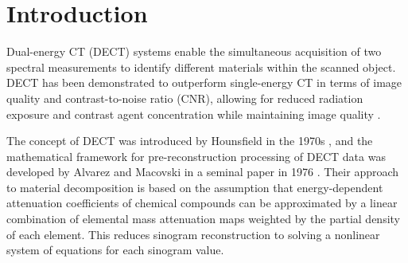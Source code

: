 \documentclass[12pt,twoside]{article}   %
\begin{document}
\newpage     %


\tableofcontents

\newpage

\setlength{\baselineskip}{0.7cm}      %

\setcounter{page}{1}
\pagestyle{fancy}

\section{Introduction}\label{sec:introduction}
Dual-energy CT (DECT) systems enable the simultaneous acquisition of two spectral measurements to identify different materials within the scanned object. DECT has been demonstrated to outperform single-energy CT in terms of image quality and contrast-to-noise ratio (CNR), allowing for reduced radiation exposure and contrast agent concentration while maintaining image quality \cite{Grant2014, Leng2015, Kalisz2018, Sakabe2018, Tabari2020}.

The concept of DECT was introduced by Hounsfield in the 1970s \cite{Hounsfield}, and the mathematical framework for pre-reconstruction processing of DECT data was developed by Alvarez and Macovski in a seminal paper in 1976 \cite{AlvarezMacovski}. Their approach to material decomposition is based on the assumption that energy-dependent attenuation coefficients of chemical compounds can be approximated by a linear combination of elemental mass attenuation maps weighted by the partial density of each element. This reduces sinogram reconstruction to solving a nonlinear system of equations for each sinogram value.
\end{document}
